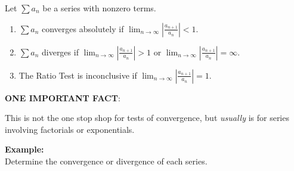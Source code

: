 \documentclass[addpoints, 12pt]{exam}
\begin{document}
\begin{tcolorbox}[title= THE RATIO TEST,black,sharp corners,colback=white,colbacktitle=white,coltitle=black]

    Let     $\displaystyle\sum a_n$ be a series with nonzero terms.
    \begin{enumerate}
        \item $\displaystyle\sum a_n$ converges absolutely if $\displaystyle\lim_{n\to\infty}\left|\frac{a_{n+1}}{a_n}\right|<1$.
        \item $\displaystyle\sum a_n$ diverges if $\displaystyle\lim_{n\to\infty}\left|\frac{a_{n+1}}{a_n}\right|>1$ or $\displaystyle\lim_{n\to\infty}\left|\frac{a_{n+1}}{a_n}\right|=\infty$.
        \item The Ratio Test is inconclusive if $\displaystyle\lim_{n\to\infty}\left|\frac{a_{n+1}}{a_n}\right|=1$.
    \end{enumerate}

\end{tcolorbox}
\vspace{.1in}
\noindent\textbf{ONE IMPORTANT FACT}:
\begin{questions}
    \question This is not the one stop shop for tests of convergence, but \textit{usually} is for series involving factorials or exponentials.
\end{questions}
\vspace{.1in}

\noindent\textbf{Example:}\\
Determine the convergence or divergence of each series.
\end{document}
